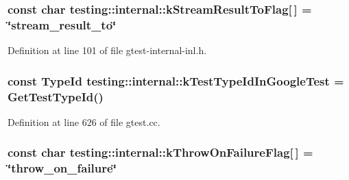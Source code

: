 \subsubsection[{\texorpdfstring{k\+Stream\+Result\+To\+Flag}{kStreamResultToFlag}}]{\setlength{\rightskip}{0pt plus 5cm}const char testing\+::internal\+::k\+Stream\+Result\+To\+Flag\mbox{[}$\,$\mbox{]} = \char`\"{}stream\+\_\+result\+\_\+to\char`\"{}}\hypertarget{namespacetesting_1_1internal_a84f8a2102d45c8b2b35be06d14ffefb8}{}\label{namespacetesting_1_1internal_a84f8a2102d45c8b2b35be06d14ffefb8}


Definition at line 101 of file gtest-\/internal-\/inl.\+h.

\subsubsection[{\texorpdfstring{k\+Test\+Type\+Id\+In\+Google\+Test}{kTestTypeIdInGoogleTest}}]{\setlength{\rightskip}{0pt plus 5cm}const {\bf Type\+Id} testing\+::internal\+::k\+Test\+Type\+Id\+In\+Google\+Test = {\bf Get\+Test\+Type\+Id}()}\hypertarget{namespacetesting_1_1internal_acac7993efabbd9dd62c1e9c7d143a72f}{}\label{namespacetesting_1_1internal_acac7993efabbd9dd62c1e9c7d143a72f}


Definition at line 626 of file gtest.\+cc.

\subsubsection[{\texorpdfstring{k\+Throw\+On\+Failure\+Flag}{kThrowOnFailureFlag}}]{\setlength{\rightskip}{0pt plus 5cm}const char testing\+::internal\+::k\+Throw\+On\+Failure\+Flag\mbox{[}$\,$\mbox{]} = \char`\"{}throw\+\_\+on\+\_\+failure\char`\"{}}\hypertarget{namespacetesting_1_1internal_ad9efcf363de3483afd91c7393a4fefb8}{}\label{namespacetesting_1_1internal_ad9efcf363de3483afd91c7393a4fefb8}


